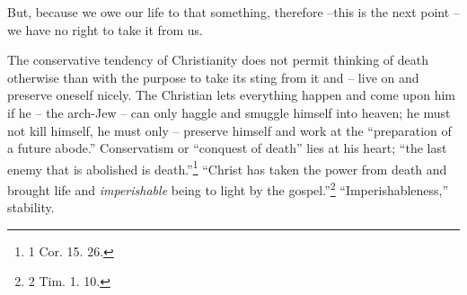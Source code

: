 But, because we owe our life to that something, therefore --this is the next 
point -- we have no right to take it from us.

The conservative tendency of Christianity does not permit thinking of death 
otherwise than with the purpose to take its sting from it and -- live on and 
preserve oneself nicely. The Christian lets everything happen and come upon 
him if he -- the arch-Jew -- can only haggle and smuggle himself into heaven; 
he must not kill himself, he must only -- preserve himself and work at the 
``preparation of a future abode.'' Conservatism or ``conquest of death'' 
lies at his heart; ``the last enemy that is abolished is death.''\footnote{1 
Cor. 15. 26.} ``Christ has taken the power from death and brought life and 
\textit{imperishable} being to light by the gospel.''\footnote{2 Tim. 1. 10.} 
``Imperishableness,'' stability.

